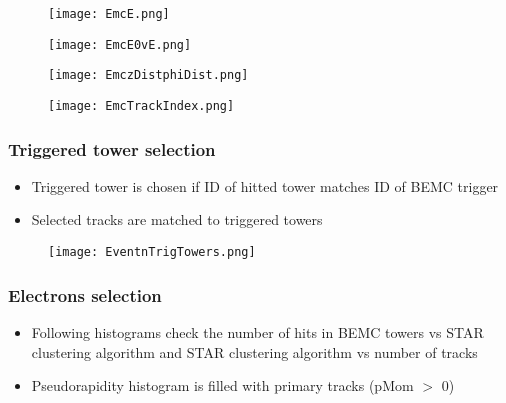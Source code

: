 \documentclass{beamer}
\begin{document}
\begin{frame}
  \begin{figure}[h!]
  \centering
  \texttt{[image: EmcE.png]}
  \end{figure}
\end{frame}

\begin{frame}
  \begin{figure}[h!]
  \centering
  \texttt{[image: EmcE0vE.png]}
  \end{figure}
\end{frame}

\begin{frame}
  \begin{figure}[h!]
  \centering
  \texttt{[image: EmczDistphiDist.png]}
  \end{figure}
\end{frame}

\begin{frame}
  \begin{figure}[h!]
  \centering
  \texttt{[image: EmcTrackIndex.png]}
  \end{figure}
\end{frame}

\begin{frame}
	\frametitle{Triggered tower selection}
	\begin{itemize}
		\item Triggered tower is chosen if ID of hitted tower matches ID of BEMC trigger
		\item Selected tracks are matched to triggered towers
	\end{itemize}
\end{frame}

\begin{frame}
	\begin{figure}[h!]
		\centering
		\texttt{[image: EventnTrigTowers.png]}
	\end{figure}
\end{frame}

\begin{frame}
	\frametitle{Electrons selection}
	\begin{itemize}
		\item Following histograms check the number of hits in BEMC towers vs STAR clustering algorithm and STAR clustering algorithm vs number of tracks
		\item Pseudorapidity histogram is filled with primary tracks (pMom $>$ 0) 
	\end{itemize}
\end{frame}
\end{document}
